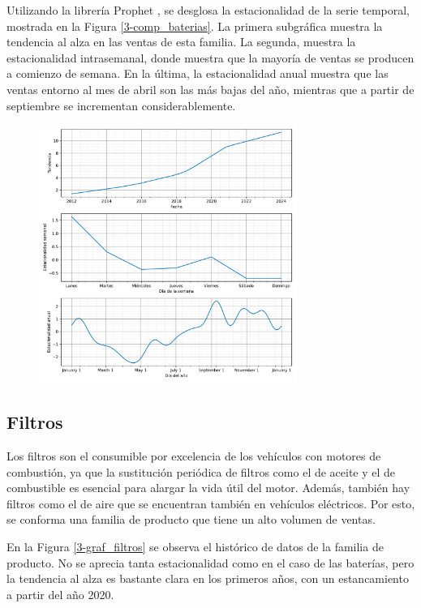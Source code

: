Utilizando la librería Prophet \cite{prophet}, se desglosa la estacionalidad de la serie temporal, mostrada en la Figura \ref*{3-comp_baterias}. La primera subgráfica muestra la tendencia al alza en las ventas de esta familia. La segunda, muestra la estacionalidad intrasemanal, donde muestra que la mayoría de ventas se producen a comienzo de semana. En la última, la estacionalidad anual muestra que las ventas entorno al mes de abril son las más bajas del año, mientras que a partir de septiembre se incrementan considerablemente.

\begin{figure}[H]
	{\includegraphics[width=0.75\textwidth]{imagenes/comps_baterias.pdf}}
\end{figure}


\subsection{Filtros}

Los filtros son el consumible por excelencia de los vehículos con motores de combustión, ya que la sustitución periódica de filtros como el de aceite y el de combustible es esencial para alargar la vida útil del motor. Además, también hay filtros como el de aire que se encuentran también en vehículos eléctricos. Por esto, se conforma una familia de producto que tiene un alto volumen de ventas.

En la Figura \ref*{3-graf_filtros} se observa el histórico de datos de la familia de producto. No se aprecia tanta estacionalidad como en el caso de las baterías, pero la tendencia al alza es bastante clara en los primeros años, con un estancamiento a partir del año 2020.

